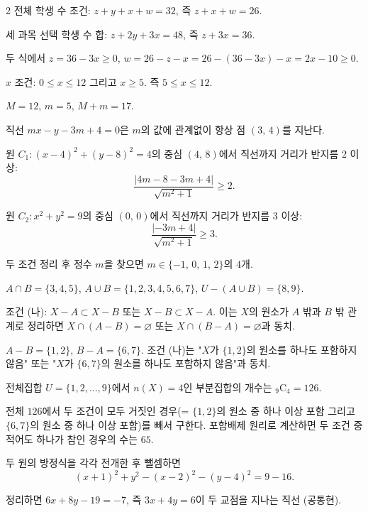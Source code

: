 \documentclass[10pt,fleqn]{article}
\begin{document}
\begin{multicols}{2}
전체 학생 수 조건: $z + y + x + w = 32$, 즉 $z + x + w = 26$.

세 과목 선택 학생 수 합: $z + 2y + 3x = 48$, 즉 $z + 3x = 36$.

두 식에서 $z = 36 - 3x \ge 0$, $w = 26 - z - x = 26 - (36-3x) - x = 2x - 10 \ge 0$.

$x$ 조건: $0 \le x \le 12$ 그리고 $x \ge 5$. 즉 $5 \le x \le 12$.

$M = 12$, $m = 5$, $M+m = 17$.


직선 $mx - y - 3m + 4 = 0$은 $m$의 값에 관계없이 항상 점 $(3,\,4)$를 지난다.

원 $C_{1}: (x-4)^{2} + (y-8)^{2} = 4$의 중심 $(4,\,8)$에서 직선까지 거리가 반지름 $2$ 이상:
\[ \dfrac{|4m - 8 - 3m + 4|}{\sqrt{m^{2}+1}} \ge 2. \]

원 $C_{2}: x^{2} + y^{2} = 9$의 중심 $(0,\,0)$에서 직선까지 거리가 반지름 $3$ 이상:
\[ \dfrac{|-3m + 4|}{\sqrt{m^{2}+1}} \ge 3. \]

두 조건 정리 후 정수 $m$을 찾으면 $m \in \{-1,\,0,\,1,\,2\}$의 $4$개.


$A \cap B = \{3,4,5\}$, $A \cup B = \{1,2,3,4,5,6,7\}$, $U - (A \cup B) = \{8, 9\}$.

조건 (나): $X - A \subset X - B$ 또는 $X - B \subset X - A$. 이는 $X$의 원소가 $A$ 밖과 $B$ 밖 관계로 정리하면 $X \cap (A - B) = \varnothing$ 또는 $X \cap (B - A) = \varnothing$과 동치.

$A - B = \{1, 2\}$, $B - A = \{6, 7\}$. 조건 (나)는 "$X$가 $\{1,2\}$의 원소를 하나도 포함하지 않음" 또는 "$X$가 $\{6,7\}$의 원소를 하나도 포함하지 않음"과 동치.

전체집합 $U = \{1, 2, \dots, 9\}$에서 $n(X) = 4$인 부분집합의 개수는 ${}_{9}\mathrm{C}_{4} = 126$.

전체 $126$에서 두 조건이 모두 거짓인 경우(= $\{1,2\}$의 원소 중 하나 이상 포함 그리고 $\{6,7\}$의 원소 중 하나 이상 포함)를 빼서 구한다. 포함배제 원리로 계산하면 두 조건 중 적어도 하나가 참인 경우의 수는 $65$.


두 원의 방정식을 각각 전개한 후 뺄셈하면
\[ (x+1)^{2} + y^{2} - (x-2)^{2} - (y-4)^{2} = 9 - 16. \]

정리하면 $6x + 8y - 19 = -7$, 즉 $3x + 4y = 6$이 두 교점을 지나는 직선 (공통현).


\end{multicols}
\end{document}
